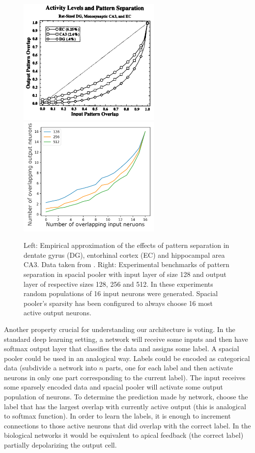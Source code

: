 \documentclass[12pt]{article}
\begin{document}
 \begin{figure}[!htbp]
 	\includegraphics[width=7cm]{dg_pattern_sep}
   \includegraphics[width=7cm]{exp_pattern_sep}
 	\caption{Left: Empirical approximation of the effects of pattern separation in dentate gyrus (DG), entorhinal cortex (EC) and hippocampal area CA3. Data taken from \cite{dg_pattern_sep}. Right: Experimental benchmarks of pattern separation in spacial pooler with input layer of size 128 and output layer of respective sizes 128, 256 and 512. In these experiments random populations of 16 input neurons were generated. Spacial pooler's sparsity has been configured to always choose 16 most active output neurons.}
 	\label{fig:dg_pattern_sep}
 \end{figure}


Another property crucial for understanding our architecture is voting. In the standard deep learning setting, a network will receive some inputs and then have softmax output layer that classifies  the data and assigns some label. A spacial pooler could be used in an analogical way. Labels could be encoded as categorical data (subdivide a network into $n$ parts, one for each label and then activate neurons in only one part corresponding to the current label). The input receives some sparsely encoded data and spacial pooler will activate some output population of neurons. To determine the prediction made by network, choose the label that has the largest overlap with currently active output (this is analogical to softmax function). In order to learn the labels, it is enough to increment connections to those active neurons that did overlap with the correct label. In the biological networks it would be equivalent to apical feedback (the correct label) partially depolarizing the output cell. 
\end{document}
